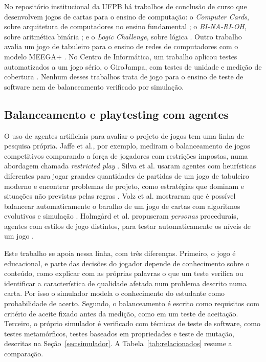 No repositório institucional da UFPB há trabalhos de conclusão de curso que desenvolvem jogos de cartas para o
ensino de computação: o \emph{Computer Cards}, sobre arquitetura de computadores no ensino fundamental
\cite{oliveira2022computercards}; o \emph{BI-NA-RI-OH}, sobre aritmética binária \cite{soares2023binarioh}; e o
\emph{Logic Challenge}, sobre lógica \cite{abreu2021logic}. Outro trabalho avalia um jogo de tabuleiro para o
ensino de redes de computadores com o modelo MEEGA+ \cite{martins2020redes,petri2017meega}. No Centro de
Informática, um trabalho aplicou testes automatizados a um jogo sério, o GiroJampa, com testes de unidade e
medição de cobertura \cite{ramos2023girojampa}. Nenhum desses trabalhos trata de jogo para o ensino de teste de
software nem de balanceamento verificado por simulação.

\subsection{Balanceamento e playtesting com agentes}

O uso de agentes artificiais para avaliar o projeto de jogos tem uma linha de pesquisa própria.
Jaffe et al., por exemplo, mediram o balanceamento de jogos competitivos comparando a força de
jogadores com restrições impostas, numa abordagem chamada \emph{restricted play} \cite{jaffe2012}.
Silva et al. usaram agentes com heurísticas diferentes para jogar grandes quantidades de partidas
de um jogo de tabuleiro moderno e encontrar problemas de projeto, como estratégias que dominam e situações não
previstas pelas regras \cite{silva2017ttr}. Volz et al. mostraram que é possível balancear
automaticamente o baralho de um jogo de cartas com algoritmos evolutivos e simulação \cite{volz2016}.
Holmgård et al. propuseram \emph{personas} procedurais, agentes com estilos de jogo distintos, para
testar automaticamente os níveis de um jogo \cite{holmgard2019}.

Este trabalho se apoia nessa linha, com três diferenças. Primeiro, o jogo é educacional, e parte das decisões do
jogador depende de conhecimento sobre o conteúdo, como explicar com as próprias palavras o que um teste verifica
ou identificar a característica de qualidade afetada num problema descrito numa carta. Por isso o simulador
modela o conhecimento do estudante como probabilidade de acerto. Segundo, o balanceamento é escrito como
requisitos com critério de aceite fixado antes da medição, como em um teste de aceitação. Terceiro, o próprio
simulador é verificado com técnicas de teste de software, como testes metamórficos, testes baseados em
propriedades e teste de mutação, descritas na Seção~\ref{sec:simulador}. A Tabela~\ref{tab:relacionados} resume
a comparação.

